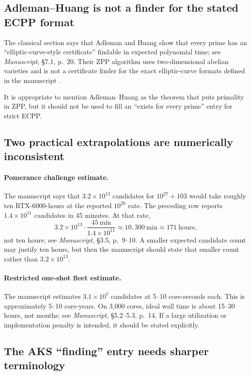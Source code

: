 \documentclass[11pt]{amsart}
\newcommand{\sourceat}[2]{\emph{Manuscript}, \S#1, p.~#2}
\begin{document}
\subsection{Adleman--Huang is not a finder for the stated ECPP format}

The classical section says that Adleman and Huang show that every prime has an ``elliptic-curve-style certificate'' findable in expected polynomial time; see \sourceat{7.1}{20}.  Their ZPP algorithm uses two-dimensional abelian varieties and is not a certificate finder for the exact elliptic-curve formats defined in the manuscript \cite{AdlemanHuang1992}.

It is appropriate to mention Adleman--Huang as the theorem that puts primality in ZPP, but it should not be used to fill an ``exists for every prime'' entry for strict ECPP.

\subsection{Two practical extrapolations are numerically inconsistent}

\paragraph{Pomerance challenge estimate.}
The manuscript says that $3.2\times10^{13}$ candidates for $10^{27}+103$ would take roughly ten RTX-6000-hours at the reported $10^{26}$ rate.  The preceding row reports $1.4\times10^{11}$ candidates in 45 minutes.  At that rate,
\[
 3.2\times10^{13}\cdot
 \frac{45\ \mathrm{min}}{1.4\times10^{11}}
 \approx 10{,}300\ \mathrm{min}
 \approx 171\ \mathrm{hours},
\]
not ten hours; see \sourceat{3.5}{9--10}.  A smaller expected candidate count may justify ten hours, but then the manuscript should state that smaller count rather than $3.2\times10^{13}$.

\paragraph{Restricted one-shot fleet estimate.}
The manuscript estimates $3.1\times10^7$ candidates at 5--10 core-seconds each.  This is approximately 5--10 core-years.  On 3,000 cores, ideal wall time is about 15--30 hours, not months; see \sourceat{5.2--5.3}{14}.  If a large utilization or implementation penalty is intended, it should be stated explicitly.

\subsection{The AKS ``finding'' entry needs sharper terminology}
\end{document}
